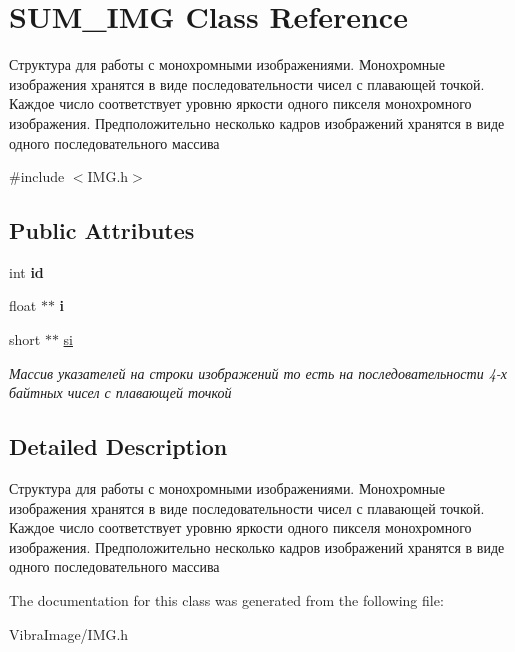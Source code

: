 \hypertarget{class_s_u_m___i_m_g}{\section{S\+U\+M\+\_\+\+I\+M\+G Class Reference}
\label{class_s_u_m___i_m_g}
}


Структура для работы с монохромными изображениями. Монохромные изображения хранятся в виде последовательности чисел с плавающей точкой. Каждое число соответствует уровню яркости одного пикселя монохромного изображения. Предположительно несколько кадров изображений хранятся в виде одного последовательного массива  




{\ttfamily \#include $<$I\+M\+G.\+h$>$}

\subsection*{Public Attributes}
\begin{DoxyCompactItemize}
\item 
\hypertarget{class_s_u_m___i_m_g_a42cfef194bb1fe08e164e015ad3e6d69}{int {\bfseries id}}\label{class_s_u_m___i_m_g_a42cfef194bb1fe08e164e015ad3e6d69}

\item 
\hypertarget{class_s_u_m___i_m_g_ac3c585d2cf35e0e9736a19daef633e02}{float $\ast$$\ast$ {\bfseries i}}\label{class_s_u_m___i_m_g_ac3c585d2cf35e0e9736a19daef633e02}

\item 
\hypertarget{class_s_u_m___i_m_g_a3da86ff936709e9963e6b0a87406afe1}{short $\ast$$\ast$ \hyperlink{class_s_u_m___i_m_g_a3da86ff936709e9963e6b0a87406afe1}{si}}\label{class_s_u_m___i_m_g_a3da86ff936709e9963e6b0a87406afe1}

\begin{DoxyCompactList}\small\item\em Массив указателей на строки изображений то есть на последовательности 4-\/х байтных чисел с плавающей точкой \end{DoxyCompactList}\end{DoxyCompactItemize}


\subsection{Detailed Description}
Структура для работы с монохромными изображениями. Монохромные изображения хранятся в виде последовательности чисел с плавающей точкой. Каждое число соответствует уровню яркости одного пикселя монохромного изображения. Предположительно несколько кадров изображений хранятся в виде одного последовательного массива 



The documentation for this class was generated from the following file\+:\begin{DoxyCompactItemize}
\item 
Vibra\+Image/I\+M\+G.\+h\end{DoxyCompactItemize}
